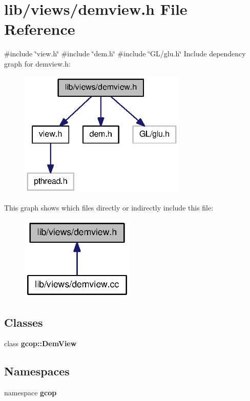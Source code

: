 \section{lib/views/demview.h \-File \-Reference}
\label{demview_8h}
{\ttfamily \#include \char`\"{}view.\-h\char`\"{}}\*
{\ttfamily \#include \char`\"{}dem.\-h\char`\"{}}\*
{\ttfamily \#include \char`\"{}\-G\-L/glu.\-h\char`\"{}}\*
\-Include dependency graph for demview.\-h\-:\nopagebreak
\begin{figure}[H]
\begin{center}
\leavevmode
\includegraphics[width=226pt]{demview_8h__incl}
\end{center}
\end{figure}
\-This graph shows which files directly or indirectly include this file\-:\nopagebreak
\begin{figure}[H]
\begin{center}
\leavevmode
\includegraphics[width=154pt]{demview_8h__dep__incl}
\end{center}
\end{figure}
\subsection*{\-Classes}
\begin{DoxyCompactItemize}
\item 
class {\bf gcop\-::\-Dem\-View}
\end{DoxyCompactItemize}
\subsection*{\-Namespaces}
\begin{DoxyCompactItemize}
\item 
namespace {\bf gcop}
\end{DoxyCompactItemize}
